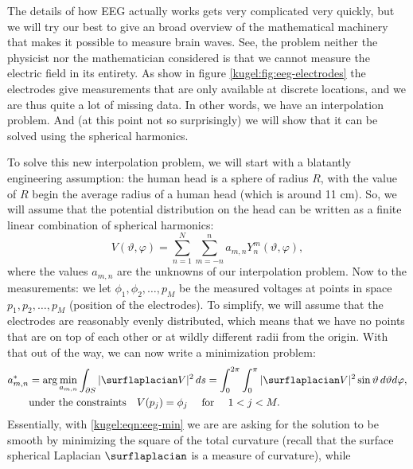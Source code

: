 The details of how EEG actually works gets very complicated very quickly, but we
will try our best to give an broad overview of the mathematical machinery that
makes it possible to measure brain waves. See, the problem neither the physicist
nor the mathematician considered is that we cannot measure the electric field in
its entirety. As show in figure \ref{kugel:fig:eeg-electrodes} the electrodes
give measurements that are only available at discrete locations, and we are thus
quite a lot of missing data. In other words, we have an interpolation problem.
And (at this point not so surprisingly) we will show that it can be solved using
the spherical harmonics.

To solve this new interpolation problem, we will start with a blatantly
engineering assumption: the human head is a sphere of radius $R$, with the value
of $R$ begin the average radius of a human head (which is around 11 cm). So, we
will assume that the potential distribution on the head can be written as a
finite linear combination of spherical harmonics:
\begin{equation*}
  V(\vartheta, \varphi)
    = \sum_{n=1}^N \sum_{m=-n}^n a_{m,n} Y^m_n(\vartheta, \varphi),
\end{equation*}
where the values $a_{m,n}$ are the unknowns of our interpolation problem. Now to
the measurements: we let $\phi_1, \phi_2, \ldots, p_M$ be the measured voltages
at points in space $p_1, p_2, \ldots, p_M$ (position of the electrodes). To
simplify, we will assume that the electrodes are reasonably evenly distributed,
which means that we have no points that are on top of each other or at wildly
different radii from the origin. With that out of the way, we can now write a
minimization problem:
\begin{subequations}
  \begin{align}
    a_{m,n}^* &= \arg \min_{a_{m,n}}
      \int_{\partial S} | \surflaplacian V |^2 \, ds 
      = \int_0^{2\pi} \int_{0}^\pi | \surflaplacian V |^2
        \sin \vartheta \, d\vartheta d\varphi, 
        \label{kugel:eqn:eeg-min} \\
    &\text{under the constraints} \quad V(p_j) = \phi_j
      \quad \text{ for } \quad 1 < j < M.
      \label{kugel:eqn:eeg-min-constraints}
  \end{align}
\end{subequations}
Essentially, with \eqref{kugel:eqn:eeg-min} we are are asking for the solution
to be smooth by minimizing the square of the total curvature (recall that the
surface spherical Laplacian $\surflaplacian$ is a measure of curvature), while
